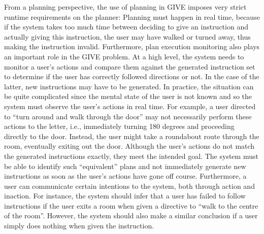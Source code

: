 From a planning perspective, the use of planning in GIVE imposes very
strict runtime requirements on the planner: Planning must happen in
real time, because if the system takes too much time between deciding
to give an instruction and actually giving this instruction, the user
may have walked or turned away, thus making the instruction invalid.
Furthermore, plan execution monitoring also plays an important role in
the GIVE problem.  At a high level, the system needs to monitor a
user's actions and compare them against the generated instruction set
to determine if the user has correctly followed directions or not. In
the case of the latter, new instructions may have to be generated. In
practice, the situation can be quite complicated since the mental
state of the user is not known and so the system must observe the
user's actions in real time. For example, a user directed to ``turn
around and walk through the door'' may not necessarily perform these
actions to the letter, i.e., immediately turning 180 degrees and
proceeding directly to the door. Instead, the user might take a
roundabout route through the room, eventually exiting out the
door. Although the user's actions do not match the generated
instructions exactly, they meet the intended goal. The system must be
able to identify such ``equivalent'' plans and not immediately
generate new instructions as soon as the user's actions have gone off
course. Furthermore, a user can communicate certain intentions to the
system, both through action and inaction. For instance, the system
should infer that a user has failed to follow instructions if the user
exits a room when given a directive to ``walk to the centre of the
room''. However, the system should also make a similar conclusion if a
user simply does nothing when given the instruction.



